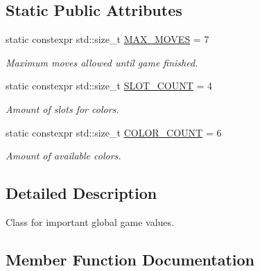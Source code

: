 \subsection*{Static Public Attributes}
\begin{DoxyCompactItemize}
\item 
\hypertarget{classmastermind_1_1_mastermind_a8bbb0daf2ebb27f688f1a30cd4488be1}{}\label{classmastermind_1_1_mastermind_a8bbb0daf2ebb27f688f1a30cd4488be1} 
static constexpr std\+::size\+\_\+t \hyperlink{classmastermind_1_1_mastermind_a8bbb0daf2ebb27f688f1a30cd4488be1}{M\+A\+X\+\_\+\+M\+O\+V\+ES} = 7
\begin{DoxyCompactList}\small\item\em Maximum moves allowed until game finished. \end{DoxyCompactList}\item 
\hypertarget{classmastermind_1_1_mastermind_ad4cfc8127641ff8dfe89d65ae232331c}{}\label{classmastermind_1_1_mastermind_ad4cfc8127641ff8dfe89d65ae232331c} 
static constexpr std\+::size\+\_\+t \hyperlink{classmastermind_1_1_mastermind_ad4cfc8127641ff8dfe89d65ae232331c}{S\+L\+O\+T\+\_\+\+C\+O\+U\+NT} = 4
\begin{DoxyCompactList}\small\item\em Amount of slots for colors. \end{DoxyCompactList}\item 
\hypertarget{classmastermind_1_1_mastermind_a934035f0e608928076c4ce68b50d30f0}{}\label{classmastermind_1_1_mastermind_a934035f0e608928076c4ce68b50d30f0} 
static constexpr std\+::size\+\_\+t \hyperlink{classmastermind_1_1_mastermind_a934035f0e608928076c4ce68b50d30f0}{C\+O\+L\+O\+R\+\_\+\+C\+O\+U\+NT} = 6
\begin{DoxyCompactList}\small\item\em Amount of available colors. \end{DoxyCompactList}\end{DoxyCompactItemize}


\subsection{Detailed Description}
Class for important global game values. 

\subsection{Member Function Documentation}
\hypertarget{classmastermind_1_1_mastermind_af22130e134506ecb5e756b931e759a03}{}\label{classmastermind_1_1_mastermind_af22130e134506ecb5e756b931e759a03} 
